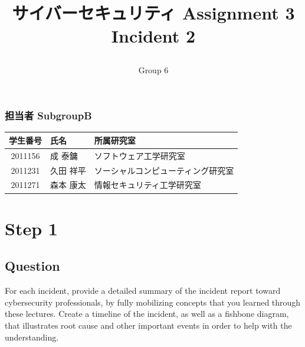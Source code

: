 \documentclass[uplatex]{jsarticle}
\title{
    \vspace{-1.5cm}
    サイバーセキュリティ Assignment 3 \\
    Incident 2
    \author{Group 6}
}
\begin{document}
\maketitle

\subsubsection*{担当者 SubgroupB}
\begin{table}[H]
    \begin{tabular}{|c|l|l|}
        \hline
        学生番号 & 氏名 & 所属研究室\\
        \hline\hline
        2011156 & 成 泰鏞 & ソフトウェア工学研究室\\
        \hline
        2011231 & 久田 祥平 & ソーシャルコンピューティング研究室\\
        \hline
        2011271 & 森本 康太 & 情報セキュリティ工学研究室\\
        \hline
    \end{tabular}
\end{table}

\section*{Step 1}
\subsection*{Question}
For each incident, provide a detailed summary of the incident report toward cybersecurity professionals, by fully mobilizing concepts that you learned through these lectures. Create a timeline of the incident, as well as a fishbone diagram, that illustrates root cause and other important events in order to help with the understanding.
\end{document}
